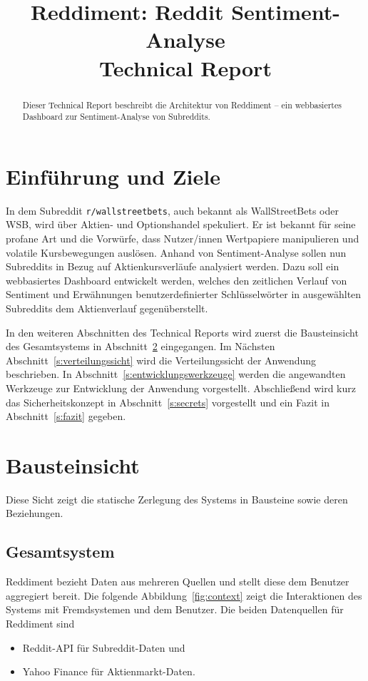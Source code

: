 \documentclass[a4paper, 10pt, conference]{IEEEtran}
\title{\LARGE
\textbf{Reddiment: Reddit Sentiment-Analyse} \\ Technical Report
}
\author{
\IEEEauthorblockN{Tobias Bauer} \IEEEauthorblockA{\textit{t.bauer@oth-aw.de}}\and
\IEEEauthorblockN{Fabian Beer} \IEEEauthorblockA{\textit{f.beer1@oth-aw.de}}\and
\IEEEauthorblockN{Daniel Holl} \IEEEauthorblockA{\textit{d.holl1@oth-aw.de}}\and\and[\\]\and
\IEEEauthorblockN{Ardian Imeraj} \IEEEauthorblockA{\textit{a.imeraj@oth-aw.de}}\and
\IEEEauthorblockN{Konrad Schweiger} \IEEEauthorblockA{\textit{k.schweiger@oth-aw.de}}\and
\IEEEauthorblockN{Philipp Stangl} \IEEEauthorblockA{\textit{p.stangl1@oth-aw.de}}\and
\IEEEauthorblockN{Wolfgang Weigl} \IEEEauthorblockA{\textit{w.weigl@oth-aw.de}}\and
}
\begin{document}
\maketitle
\thispagestyle{empty}
\pagestyle{empty}

\begin{abstract}
Dieser Technical Report beschreibt die Architektur von Reddiment -- ein webbasiertes Dashboard zur Sentiment-Analyse von Subreddits.
\end{abstract}

\section{Einführung und Ziele}

In dem Subreddit \texttt{r/wallstreetbets}, auch bekannt als WallStreetBets oder WSB, wird über Aktien- und Optionshandel spekuliert. Er ist bekannt für seine profane Art und die Vorwürfe, dass Nutzer/innen Wertpapiere manipulieren und volatile Kursbewegungen auslösen. Anhand von Sentiment-Analyse sollen nun Subreddits in Bezug auf Aktienkursverläufe analysiert werden. Dazu soll ein webbasiertes Dashboard entwickelt werden, welches den zeitlichen Verlauf von Sentiment und Erwähnungen benutzerdefinierter Schlüsselwörter in ausgewählten Subreddits dem Aktienverlauf gegenüberstellt.

In den weiteren Abschnitten des Technical Reports wird zuerst die Bausteinsicht des Gesamtsystems in Abschnitt~\ref{s:bausteinsicht} eingegangen. Im Nächsten Abschnitt~\ref{s:verteilungssicht} wird die Verteilungssicht der Anwendung beschrieben. In Abschnitt~\ref{s:entwicklungswerkzeuge} werden die angewandten Werkzeuge zur Entwicklung der Anwendung vorgestellt. Abschließend wird kurz das Sicherheitskonzept in Abschnitt~\ref{s:secrets} vorgestellt und ein Fazit in Abschnitt~\ref{s:fazit} gegeben.

\section{Bausteinsicht} \label{s:bausteinsicht}
Diese Sicht zeigt die statische Zerlegung des Systems in Bausteine sowie deren Beziehungen.

\subsection{Gesamtsystem}
Reddiment bezieht Daten aus mehreren Quellen und stellt diese dem Benutzer aggregiert bereit. Die folgende Abbildung~\ref{fig:context} zeigt die Interaktionen des Systems mit Fremdsystemen und dem Benutzer. Die beiden Datenquellen für Reddiment sind
\begin{itemize}
  \item Reddit-API für Subreddit-Daten und
  \item Yahoo Finance für Aktienmarkt-Daten.
\end{itemize}
\end{document}
